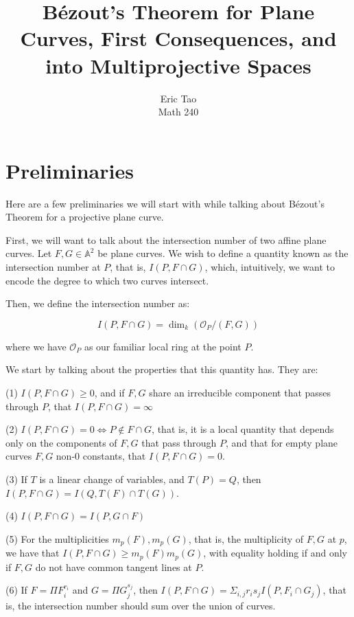 \documentclass[10pt]{article}
\begin{document}
 
\title{B\'ezout’s Theorem for Plane Curves, First Consequences, and into Multiprojective Spaces}
\author{Eric Tao\\
Math 240}
\maketitle
 
\section{Preliminaries}

Here are a few preliminaries we will start with while talking about B\'ezout’s Theorem for a projective plane curve. 

First, we will want to talk about the intersection number of two affine plane curves. Let $F, G \in \mathbb{A}^2$ be plane curves. We wish to define a quantity known as the intersection number at $P$, that is, $I(P, F \cap G)$, which, intuitively, we want to encode the degree to which two curves intersect.

Then, we define the intersection number as:

$$ I(P,F \cap G) = \dim_k(\mathcal{O}_P/(F,G)) $$

where we have $\mathcal{O}_P$ as our familiar local ring at the point $P$.

We start by talking about the properties that this quantity has. They are:

(1) $I(P, F \cap G) \geq 0$, and if $F, G$ share an irreducible component that passes through $P$, that $I(P, F \cap G) = \infty$

(2) $I(P, F \cap G) = 0 \iff P \not \in F \cap G$, that is, it is a local quantity that depends only on the components of $F,G$ that pass through $P$, and that for empty plane curves $F, G$ non-0 constants, that $I(P, F \cap G) = 0$.

(3) If $T$ is a linear change of variables, and $T(P) = Q$, then $I(P, F \cap G) = I(Q, T(F) \cap T(G))$.

(4) $I(P, F \cap G) = I(P, G \cap F)$

(5) For the multiplicities $m_p(F), m_p(G)$, that is, the multiplicity of $F,G$ at $p$, we have that $I(P, F \cap G) \geq m_p(F)m_p(G)$, with equality holding if and only if $F,G$ do not have common tangent lines at $P$.

(6) If $F = \Pi F_i^{r_i}$ and $G = \Pi G_j^{s_j}$, then $I(P, F \cap G) = \Sigma_{i,j} r_is_j I(P,F_i \cap G_j)$, that is, the intersection number should sum over the union of curves.
\end{document}
